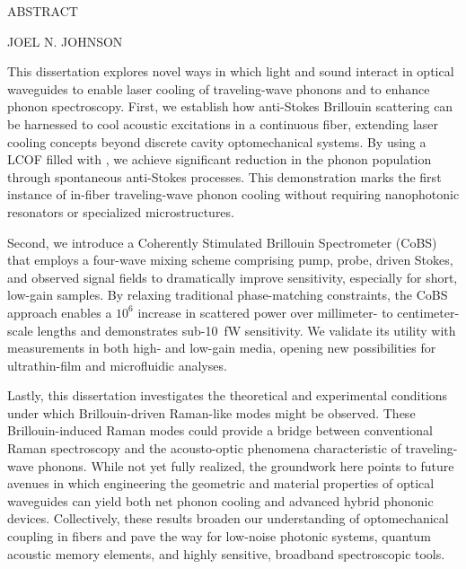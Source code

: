 {}

\begin{center}
    \large
    ABSTRACT

    \large
    \dissertationTitle{}

    \large
    \vspace{2mm}
    JOEL N. JOHNSON

\end{center}

\noindent

This dissertation explores novel ways in which light and sound interact in optical waveguides to enable laser cooling of traveling-wave phonons and to enhance phonon spectroscopy. First, we establish how anti-Stokes Brillouin scattering can be harnessed to cool acoustic excitations in a continuous fiber, extending laser cooling concepts beyond discrete cavity optomechanical systems. By using a \ac{LCOF} filled with , we achieve significant reduction in the phonon population through spontaneous anti-Stokes processes. This demonstration marks the first instance of in-fiber traveling-wave phonon cooling without requiring nanophotonic resonators or specialized microstructures.

Second, we introduce a Coherently Stimulated Brillouin Spectrometer (\acs{CoBS}) that employs a four-wave mixing scheme comprising pump, probe, driven Stokes, and observed signal fields to dramatically improve sensitivity, especially for short, low-gain samples. By relaxing traditional phase-matching constraints, the CoBS approach enables a \(10^{6}\) increase in scattered power over millimeter- to centimeter-scale lengths and demonstrates sub-\SI{10}{\femto\watt} sensitivity. We validate its utility with measurements in both high- and low-gain media, opening new possibilities for ultrathin-film and microfluidic analyses.

Lastly, this dissertation investigates the theoretical and experimental conditions under which Brillouin-driven Raman-like modes might be observed. These Brillouin-induced Raman modes could provide a bridge between conventional Raman spectroscopy and the acousto-optic phenomena characteristic of traveling-wave phonons. While not yet fully realized, the groundwork here points to future avenues in which engineering the geometric and material properties of optical waveguides can yield both net phonon cooling and advanced hybrid phononic devices. Collectively, these results broaden our understanding of optomechanical coupling in fibers and pave the way for low-noise photonic systems, quantum acoustic memory elements, and highly sensitive, broadband spectroscopic tools.
